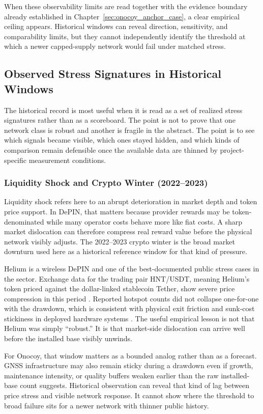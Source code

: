 When these observability limits are read together with the evidence boundary already established in Chapter~\ref{sec:onocoy_anchor_case}, a clear empirical ceiling appears. Historical windows can reveal direction, sensitivity, and comparability limits, but they cannot independently identify the threshold at which a newer capped-supply network would fail under matched stress.

\subsection{Observed Stress Signatures in Historical Windows}
The historical record is most useful when it is read as a set of realized stress signatures rather than as a scoreboard. The point is not to prove that one network class is robust and another is fragile in the abstract. The point is to see which signals became visible, which ones stayed hidden, and which kinds of comparison remain defensible once the available data are thinned by project-specific measurement conditions.

\subsubsection*{Liquidity Shock and Crypto Winter (2022--2023)}
Liquidity shock refers here to an abrupt deterioration in market depth and token price support. In DePIN, that matters because provider rewards may be token-denominated while many operator costs behave more like fiat costs. A sharp market dislocation can therefore compress real reward value before the physical network visibly adjusts. The 2022--2023 crypto winter is the broad market downturn used here as a historical reference window for that kind of pressure.

Helium is a wireless DePIN and one of the best-documented public stress cases in the sector. Exchange data for the trading pair HNT/USDT, meaning Helium's token priced against the dollar-linked stablecoin Tether, show severe price compression in this period \cite{BinanceHNTUSDTWeekly2022_2023, Ho2022}. Reported hotspot counts did not collapse one-for-one with the drawdown, which is consistent with physical exit friction and sunk-cost stickiness in deployed hardware systems \cite{Ballandies2023}. The useful empirical lesson is not that Helium was simply ``robust.'' It is that market-side dislocation can arrive well before the installed base visibly unwinds.

For Onocoy, that window matters as a bounded analog rather than as a forecast. GNSS infrastructure may also remain sticky during a drawdown even if growth, maintenance intensity, or quality buffers weaken earlier than the raw installed-base count suggests. Historical observation can reveal that kind of lag between price stress and visible network response. It cannot show where the threshold to broad failure sits for a newer network with thinner public history.

